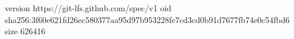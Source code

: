 version https://git-lfs.github.com/spec/v1
oid sha256:3f60e621fd26ec580377aa95d97b953228fe7cd3cd0b91d7677fb74e0c54fbd6
size 626416

